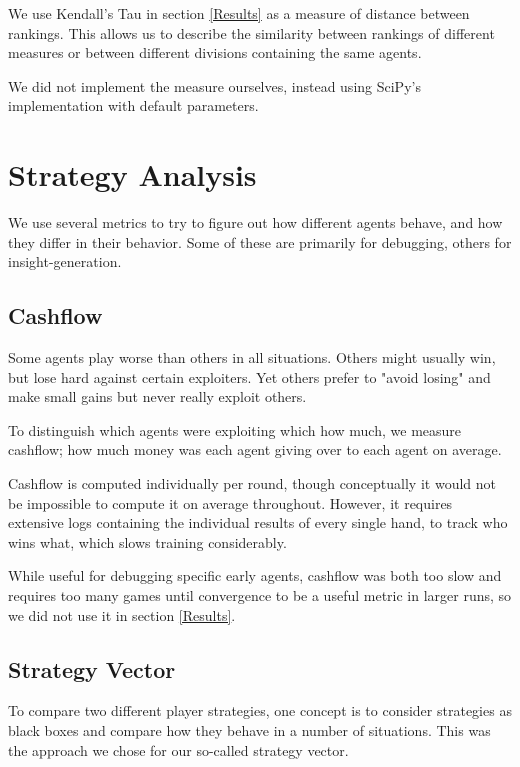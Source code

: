 We use Kendall's Tau \cite{KendallTau} in section \ref{Results} as a measure of distance between rankings. This allows us to describe the similarity between rankings of different measures or between different divisions containing the same agents.


We did not implement the measure ourselves, instead using SciPy's implementation \cite{Scipy} with default parameters.

\section{Strategy Analysis}

We use several metrics to try to figure out how different agents behave, and how they differ in their behavior. Some of these are primarily for debugging, others for insight-generation.

\subsection{Cashflow}

Some agents play worse than others in all situations. Others might usually win, but lose hard against certain exploiters. Yet others prefer to "avoid losing" and make small gains but never really exploit others.

To distinguish which agents were exploiting which how much, we measure cashflow; how much money was each agent giving over to each agent on average.

Cashflow is computed individually per round, though conceptually it would not be impossible to compute it on average throughout. However, it requires extensive logs containing the individual results of every single hand, to track who wins what, which slows training considerably.

While useful for debugging specific early agents, cashflow was both too slow and requires too many games until convergence to be a useful metric in larger runs, so we did not use it in section \ref{Results}.

\subsection{Strategy Vector}
\label{StrategyVectorComputation}
To compare two different player strategies, one concept is to consider strategies as black boxes and compare how they behave in a number of situations. This was the approach we chose for our so-called strategy vector.

